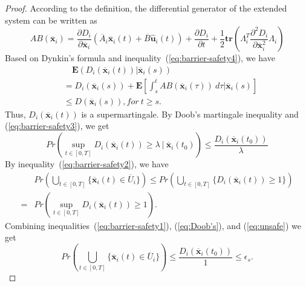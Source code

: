 \documentclass[journal]{IEEEtran}
\begin{document}
\begin{proof}
According to the definition, the differential generator of the extended system can be written as
\begin{equation*}
    \label{eq:generator}
    AB(\overline{\mathbf{x}}_i) = \frac{\partial D_i}{\partial \overline{\mathbf{x}}_i}(\overline{A}_i\overline{\mathbf{x}}_i(t) + \overline{B}\hat{\mathbf{u}}_i(t)) + \frac{\partial D_i}{\partial t} + \frac{1}{2}\mathbf{tr}\left(\Lambda_i^{T}\frac{\partial^{2}D_i}{\partial\overline{\mathbf{x}}_i^{2}}\Lambda_i\right)
\end{equation*}
Based on Dynkin's formula and inequality~(\ref{eq:barrier-safety4}), we have
\begin{equation*}
    \begin{array}{ll}
        &\quad\mathbf{E}(D_i(\overline{\mathbf{x}}_i(t)) | \overline{\mathbf{x}}_i(s)) \\
        &= D_i(\overline{\mathbf{x}}_i(s))+ \mathbf{E}\left[\int_{s}^{t}{AB(\overline{\mathbf{x}}_i(\tau)) \ d\tau} | \overline{\mathbf{x}}_i(s)\right] \nonumber\\
        &\leq D(\overline{\mathbf{x}}_i(s)), for \ t \geq s.
    \end{array}
\end{equation*}
Thus, $D_i(\overline{\mathbf{x}}_i(t))$ is a supermartingale. By Doob's martingale inequality and (\ref{eq:barrier-safety3}), we get
\begin{equation}
\label{eq:Doob's}
    Pr\left(\sup_{t \in [0,T]}{D_i(\overline{\mathbf{x}}_i(t))} \geq \lambda \ | \ \overline{\mathbf{x}}_i(t_0) \right) \leq \frac{D_i(\overline{\mathbf{x}}_i(t_0))}{\lambda}
\end{equation}
By inequality~(\ref{eq:barrier-safety2}), we have
\begin{align}
\label{eq:unsafe}
    &Pr\left(\bigcup_{t \in [0,T]}{\{\overline{\mathbf{x}}_i(t) \in \overline{U}_i\}}\right) \leq Pr\left(\bigcup_{t \in [0,T]}{\{D_i(\overline{\mathbf{x}}_i(t)) \geq 1\}}\right) \nonumber\\
    = &Pr\left(\sup_{t \in [0,T]}{D_i(\overline{\mathbf{x}}_i(t))} \geq 1\right).
\end{align}
Combining inequalities~(\ref{eq:barrier-safety1}), (\ref{eq:Doob's}), and (\ref{eq:unsafe}) we get
\begin{equation}
    Pr\left(\bigcup_{t \in [0,T]}{\{\overline{\mathbf{x}}_i(t) \in \overline{U}_i\}}\right) \leq \frac{D_i(\overline{\mathbf{x}}_i(t_0))}{1} \leq \epsilon_s.
\end{equation}
\end{proof}
\end{document}
